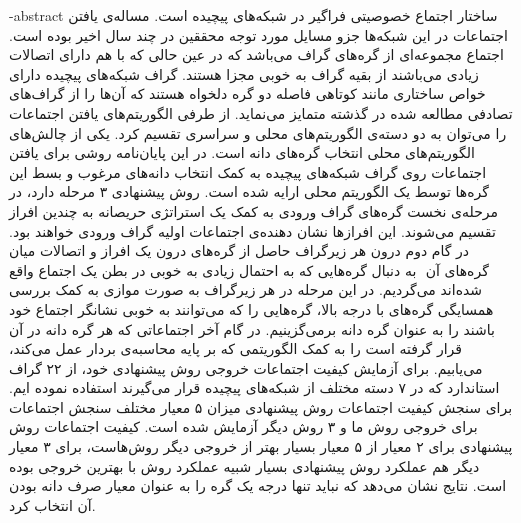 \fa-abstract{
ساختار اجتماع خصوصیتی فراگیر در شبکه‌های پیچیده است. مساله‌ی یافتن اجتماعات در این شبکه‌ها جزو‌ مسایل مورد توجه محققین در
چند سال اخیر بوده است.
اجتماع مجموعه‌ای از گره‌های گراف می‌باشد
که در عین حالی که با هم دارای اتصالات زیادی می‌باشند از بقیه گراف به خوبی مجزا هستند.
گراف‌ ‌شبکه‌های پیچیده دارای خواص ساختاری مانند کوتاهی فاصله‌ دو گره‌ دلخواه هستند
که آن‌ها را از گراف‌های تصادفی مطالعه شده در گذشته متمایز می‌نماید.
از طرفی الگوریتم‌های یافتن اجتماعات را می‌توان به دو دسته‌ی الگوریتم‌های محلی و سراسری تقسیم کرد.
یکی از چالش‌های الگوریتم‌های محلی انتخاب گره‌های دانه است.
در این پایان‌نامه روشی برای یافتن اجتماعات روی گراف شبکه‌های
پیچیده به کمک انتخاب دانه‌های مرغوب و بسط این گره‌ها توسط یک الگوریتم محلی ارایه شده است.
 روش‌ پیشنهادی ۳ مرحله دارد،
 در مرحله‌ی نخست گره‌های گراف ورودی به کمک یک استراتژی حریصانه به چندین افراز تقسیم می‌شوند.
 این افراز‌ها نشان دهنده‌ی اجتماعات اولیه گراف‌ ورودی خواهند بود.
 در گام دوم درون هر زیرگراف حاصل از گره‌های درون یک افراز و اتصالات میان گره‌های آن
 ‌  به دنبال گره‌هایی که به احتمال زیادی به خوبی در بطن یک اجتماع واقع شده‌اند می‌گردیم.
  در این مرحله در هر زیرگراف به صورت موازی به کمک بررسی همسایگی گره‌های
  با درجه‌ بالا، گره‌هایی را که می‌توانند به خوبی نشانگر اجتماع خود باشند را به عنوان گره‌ دانه برمی‌گزینیم.
 در گام آخر اجتماعاتی که هر گره دانه در آن قرار گرفته است را به کمک الگوریتمی که بر پایه محاسبه‌ی
 بردار
عمل می‌کند، می‌یابیم.
 برای آزمایش کیفیت اجتماعات خروجی
 روش پیشنهادی خود، از ۲۲ گراف استاندارد که در ۷ دسته مختلف از شبکه‌های پیچیده قرار می‌گیرند استفاده نموده ایم.
 برای سنجش کیفیت اجتماعات روش‌ پیشنهادی میزان ۵ معیار مختلف سنجش اجتماعات برای خروجی روش ‌ما و ۳ روش دیگر آزمایش شده است.
 کیفیت اجتماعات روش پیشنهادی برای ۲ معیار از ۵ معیار بسیار بهتر از خروجی دیگر روش‌هاست، برای ۳ معیار دیگر هم عملکرد
 روش‌ پیشنهادی بسیار شبیه عملکرد روش با بهترین خروجی بوده است.
نتایج‌ نشان‌ می‌دهد که نباید تنها درجه‌ یک گره‌ را به عنوان معیار صرف دانه بودن آن انتخاب کرد.
}

\abstractPage

\newpage\clearpage